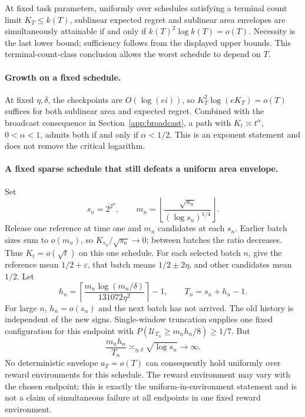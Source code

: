 At fixed task parameters, uniformly over schedules satisfying a terminal
count limit $K_T\le k(T)$, sublinear expected regret and sublinear area
envelopes are simultaneously attainable if and only if
$k(T)^2\log k(T)=o(T)$. Necessity is the last lower bound; sufficiency follows
from the displayed upper bounds. This terminal-count-class conclusion
allows the worst schedule to depend on $T$.

\paragraph{Growth on a fixed schedule.}
At fixed $\eta,\delta$, the checkpoints are $O(\log(ei))$, so
$K_T^2\log(eK_T)=o(T)$ suffices for both sublinear area and expected regret.
Combined with the broadcast consequence in Section~\ref{app:broadcast}, a path with
$K_t\asymp t^\alpha$, $0<\alpha<1$, admits both if and only if $\alpha<1/2$.
This is an exponent statement and does not remove the critical logarithm.


\paragraph{A fixed sparse schedule that still defeats a uniform area envelope.}
Set
\[
 s_n=2^{2^n},\qquad
 m_n=\left\lfloor\frac{\sqrt{s_n}}{(\log s_n)^{1/4}}\right\rfloor.
\]
Release one reference at time one and $m_n$ candidates at each $s_n$.
Earlier batch sizes sum to $o(m_n)$, so $K_{s_n}/\sqrt{s_n}\to0$; between
batches the ratio decreases. Thus $K_t=o(\sqrt t)$ on this one schedule.
For each selected batch $n$, give the reference mean $1/2+\varepsilon$,
that batch means $1/2\pm2\eta$, and other candidates mean $1/2$. Let
\[
 h_n=\left\lceil\frac{m_n\log(m_n/\delta)}{131072\eta^2}\right\rceil-1,
 \qquad T_n=s_n+h_n-1.
\]
For large $n$, $h_n=o(s_n)$ and the next batch has not arrived. The old
history is independent of the new signs. Single-window truncation supplies
one fixed configuration for this endpoint with
$P(\mathcal U_{T_n}\ge m_nh_n/8)\ge1/7$. But
\[
 \frac{m_nh_n}{T_n}\asymp_{\eta,\delta}\sqrt{\log s_n}\longrightarrow\infty.
\]
No deterministic envelope $a_T=o(T)$ can consequently hold uniformly over
reward environments for this schedule. The reward environment may vary
with the chosen endpoint; this is exactly the uniform-in-environment
statement and is not a claim of simultaneous failure at all endpoints in
one fixed reward environment.
